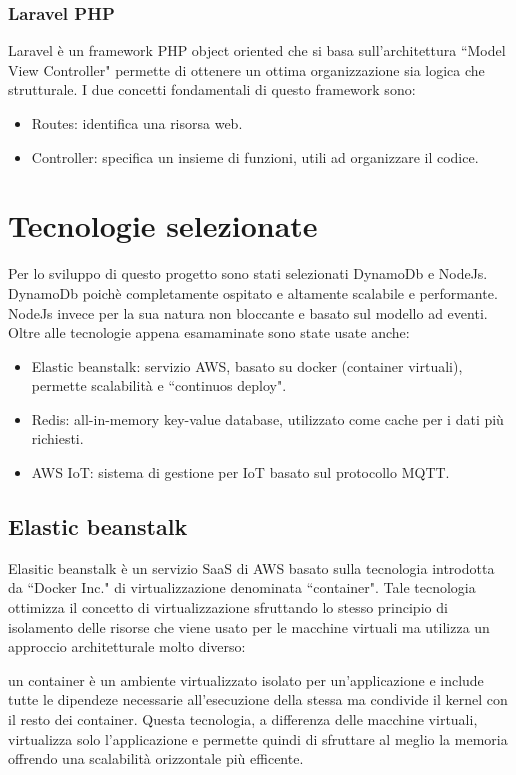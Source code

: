\subsubsection{Laravel PHP}
Laravel è un framework PHP object oriented che si basa sull'architettura ``Model View Controller" permette di ottenere un ottima organizzazione sia logica che strutturale. I due concetti fondamentali di questo framework sono:
\begin{itemize}
	\item Routes: identifica una risorsa web.
	\item Controller: specifica un insieme di funzioni, utili ad organizzare il codice.

\end{itemize}
\section{Tecnologie selezionate}
Per lo sviluppo di questo progetto sono stati selezionati DynamoDb e NodeJs. DynamoDb poichè completamente ospitato e altamente scalabile e performante.
NodeJs invece per la sua natura non bloccante e basato sul modello ad eventi. Oltre alle tecnologie appena esamaminate sono state usate anche:
\begin{itemize}
	\item Elastic beanstalk: servizio AWS, basato su docker (container virtuali), permette scalabilità e ``continuos deploy". 
	\item Redis: all-in-memory key-value database, utilizzato come cache per i dati più richiesti.
	\item AWS IoT: sistema di gestione per IoT basato sul protocollo MQTT.
\end{itemize}


\subsection{Elastic beanstalk}
Elasitic beanstalk è un servizio SaaS di AWS basato sulla tecnologia introdotta da ``Docker Inc." di virtualizzazione denominata ``container". Tale tecnologia ottimizza il concetto di virtualizzazione sfruttando lo stesso principio di isolamento delle risorse che viene usato per le macchine virtuali ma utilizza un approccio architetturale molto diverso: 

un container è un ambiente virtualizzato isolato per un'applicazione e include tutte le dipendeze necessarie all'esecuzione della stessa ma condivide il kernel con il resto dei container. Questa tecnologia, a differenza delle macchine virtuali, virtualizza solo l'applicazione e permette quindi di sfruttare al meglio la memoria offrendo una scalabilità orizzontale più efficente.

